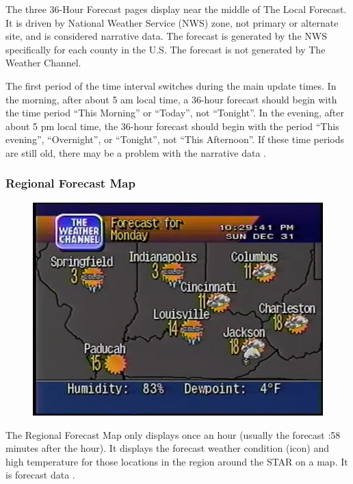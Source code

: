 \documentclass[a4paper,11pt]{refart}
\begin{document}
The three 36-Hour Forecast pages display near the middle of The Local Forecast. It is driven by National Weather Service (NWS) zone, not primary or alternate site, and is considered narrative data. The forecast is generated by the NWS specifically for each county in the U.S. The forecast is not generated by The Weather Channel.

The first period of the time interval switches during the main update times. In the morning, after about 5 am local time, a 36-hour forecast should begin with the time period “This Morning” or “Today”, not “Tonight”. In the evening, after about 5 pm local time, the 36-hour forecast should begin with the period “This evening”, “Overnight”, or “Tonight”, not “This Afternoon”. If these time periods are still old, there may be a problem with the narrative data \cite{WS4KProdGde}.

\subsubsection*{Regional Forecast Map}

\begin{figure}[ht!]\centering
\includegraphics[width=\textwidth]{img/reg-forc.png}
\end{figure}

The Regional Forecast Map only displays once an hour (usually the forecast :58 minutes after the hour). It displays the forecast weather condition (icon) and high temperature for those locations in the region around the STAR on a map. It is forecast data \cite{WS4KProdGde}.
\end{document}
